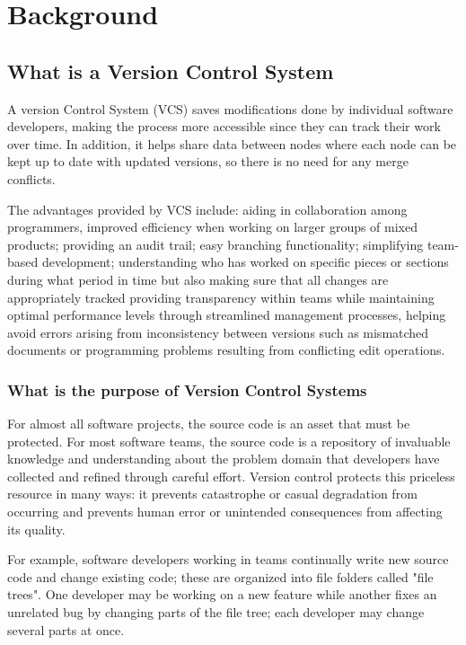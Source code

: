 \chapter{Background}
\section{What is a Version Control System}
A version Control System (VCS) saves modifications done by individual software developers, making the process more accessible since they can track their work over time. In addition, it helps share data between nodes where each node can be kept up to date with updated versions, so there is no need for any merge conflicts.

The advantages provided by VCS include: aiding in collaboration among programmers, improved efficiency when working on larger groups of mixed products; providing an audit trail; easy branching functionality; simplifying team-based development; understanding who has worked on specific pieces or sections during what period in time but also making sure that all changes are appropriately tracked providing transparency within teams while maintaining optimal performance levels through streamlined management processes, helping avoid errors arising from inconsistency between versions such as mismatched documents or programming problems resulting from conflicting edit operations.
\subsection{What is the purpose of Version Control Systems}
For almost all software projects, the source code is an asset that must be protected. For most software teams, the source code is a repository of invaluable knowledge and understanding about the problem domain that developers have collected and refined through careful effort. Version control protects this priceless resource in many ways: it prevents catastrophe or casual degradation from occurring and prevents human error or unintended consequences from affecting its quality.

For example, software developers working in teams continually write new source code and change existing code; these are organized into file folders called "file trees". One developer may be working on a new feature while another fixes an unrelated bug by changing parts of the file tree; each developer may change several parts at once.


